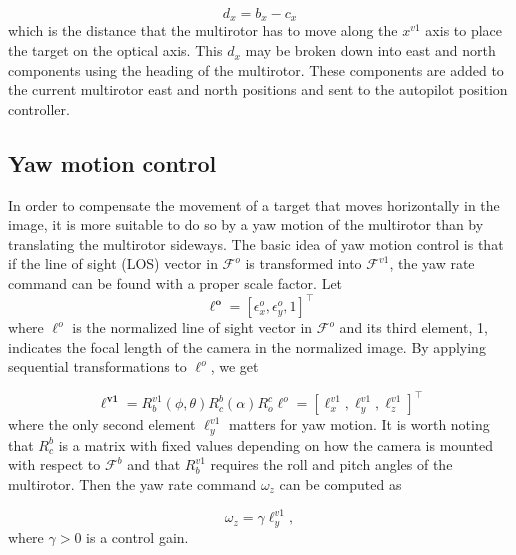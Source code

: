 \documentclass[letterpaper, 10 pt, conference]{ieeeconf}  %
\begin{document}
\begin{equation}
d_x=b_x-c_x
\label{eq7}
\end{equation} which is the distance that the multirotor has to move along the $x^{v1}$ axis to place the target on the optical axis. This $d_x$ may be broken down into east and north components using the heading of the multirotor. These components are added to the current multirotor east and north positions and sent to the autopilot position controller.


\subsection{Yaw motion control}
In order to compensate the movement of a target that moves horizontally in the image, it is more suitable to do so by a yaw motion of the multirotor than by translating the multirotor sideways. The basic idea of yaw motion control is that if the line of sight (LOS) vector in $\mathcal{F}^o$ is transformed into $\mathcal{F}^{v1}$, the yaw rate command can be found with a proper scale factor. Let 
\begin{equation}
\mathbf{\ell^o}=[\epsilon_x^o, \epsilon_y^o, 1]^\top
\label{eq8}
\end{equation} where $\ell^o$ is the normalized line of sight vector in $\mathcal{F}^o$ and its third element, 1, indicates the focal length of the camera in the normalized image. By applying sequential transformations to $\ell^o$, we get

\begin{equation}
\mathbf{\ell^{v1}}=R^{v1}_b(\phi,\theta)R^b_c(\alpha)R^c_o\ell^o=[\ell^{v1}_x, \ell^{v1}_y, \ell^{v1}_z]^\top
\label{eq9}
\end{equation} where the only second element $\ell^{v1}_y$ matters for yaw motion. It is worth noting that $R^b_c$ is a matrix with fixed values depending on how the camera is mounted with respect to $\mathcal{F}^b$ and that $R^{v1}_b$ requires the roll and pitch angles of the multirotor. Then the yaw rate command $\omega_z$ can be computed as 

\begin{equation}
\omega_z=\gamma \ell^{v1}_y,
\label{eq10}
\end{equation} where $\gamma>0$ is a control gain.
\end{document}
